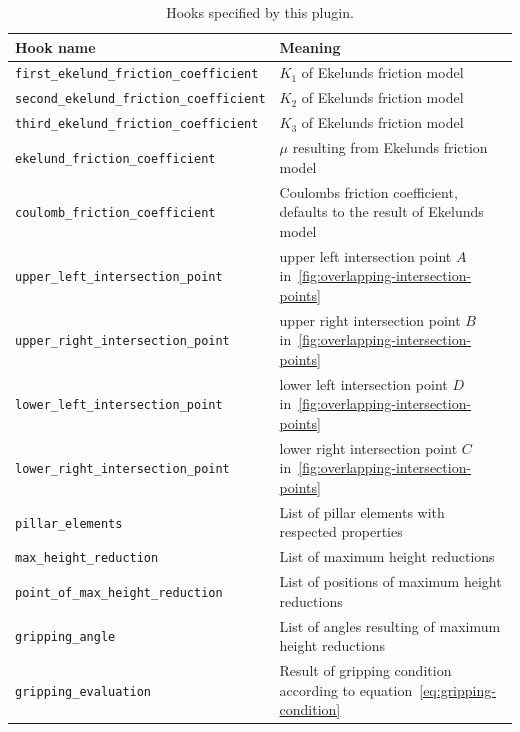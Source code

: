 \documentclass[11pt]{PyRollDocs}
\begin{document}
    \begin{table}
        \centering
        \caption{Hooks specified by this plugin.}
        \label{tab:hookspecs}
        \begin{tabular}{ll}
            \toprule
            Hook name                                       & Meaning                                                                         \\
            \midrule
            \texttt{first\_ekelund\_friction\_coefficient}  & $K_1$ of Ekelunds friction model                                                \\
            \texttt{second\_ekelund\_friction\_coefficient} & $K_2$ of Ekelunds friction model                                                \\
            \texttt{third\_ekelund\_friction\_coefficient}  & $K_3$ of Ekelunds friction model                                                \\
            \texttt{ekelund\_friction\_coefficient}         & $\mu$ resulting from Ekelunds friction model                                    \\
            \texttt{coulomb\_friction\_coefficient}         & Coulombs friction coefficient, defaults to the result of Ekelunds model         \\
            \texttt{upper\_left\_intersection\_point}       & upper left intersection point $A$ in~\ref{fig:overlapping-intersection-points}  \\
            \texttt{upper\_right\_intersection\_point}      & upper right intersection point $B$ in~\ref{fig:overlapping-intersection-points} \\
            \texttt{lower\_left\_intersection\_point}       & lower left intersection point $D$ in~\ref{fig:overlapping-intersection-points}  \\
            \texttt{lower\_right\_intersection\_point}      & lower right intersection point $C$ in~\ref{fig:overlapping-intersection-points} \\
            \texttt{pillar\_elements}                       & List of pillar elements with respected properties                               \\
            \texttt{max\_height\_reduction}                 & List of maximum height reductions                                               \\
            \texttt{point\_of\_max\_height\_reduction}      & List of positions of maximum height reductions                                  \\
            \texttt{gripping\_angle}                        & List of angles resulting of maximum height reductions                           \\
            \texttt{gripping\_evaluation}                   & Result of gripping condition according to equation~\ref{eq:gripping-condition}  \\
            \bottomrule
        \end{tabular}
    \end{table}

    \printbibliography
\end{document}
